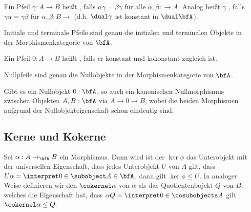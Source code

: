 \begin{definition}
    Ein Pfeil $\gamma:A\to B$ heißt , falls $\alpha\gamma=\beta\gamma$
    für alle $\alpha,\beta:\to A$. Analog heißt $\gamma$ , falls
    $\gamma\alpha=\gamma\beta$ für $\alpha,\beta:B\to$ (d.h. $\dual\gamma$ ist konstant in $\dual\bfA$).
\end{definition}

\begin{remark}
    Initiale und terminale Pfeile sind genau die initialen und terminalen Objekte in der Morphismenkategorie von $\bfA$. 
\end{remark}

\begin{definition}[Nullpfeil]
    Ein Pfeil $0:A\to B$ heißt , falls er konstant und kokonstant zugleich ist.
\end{definition}

\begin{remark}
    Nullpfeile sind genau die Nullobjekte in der Morphismenkategorie von $\bfA$.
\end{remark}

\begin{remark}
    Gibt es ein Nullobjekt $0:\bfA$, so auch ein kanonischen Nullmorphismus zwischen Objekten $A,B:\bfA$ via $A\to 0\to B$, wobei
    die beiden Morphismen aufgrund der Nullobjekteigenschaft schon eindeutig sind. 
\end{remark}


\subsection{Kerne und Kokerne}

\begin{definition}
Sei $\alpha:A\to_\bfA B$ ein Morphismus. Dann wird ist der  $\ker\phi$ das Unterobjekt mit der universellen Eigenschaft, dass jedes
Unterobjekt $U$ von $A$ gilt, dass $U\alpha=\interpret 0\in{\subobject A\in\bfA}$, dann gilt $\ker\phi\leq U$.
In analoger Weise definieren wir den  $\cokernel \alpha$ von $\alpha$ als das Quotientenbojekt $Q$ von $B$, welches die
Eigenschaft hat, dass $\alpha Q=\interpret 0\in{\cosubobjects A}$ gilt $\cokernel \alpha\leq Q$.
\end{definition}

